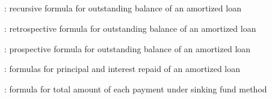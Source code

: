 \subsection*{}
\item {}: recursive formula for outstanding balance of an amortized loan
\item {}: retrospective formula for outstanding balance of an amortized loan
\item {}: prospective formula for outstanding balance of an amortized loan
\item {}: formulas for principal and interest repaid of an amortized loan
\item {}: formula for total amount of each payment under sinking fund method
